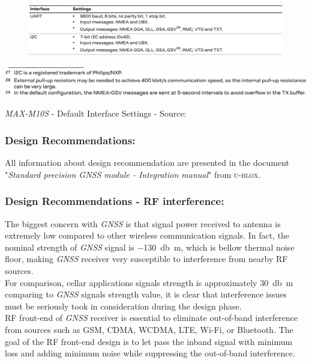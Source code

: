 \documentclass[report.tex]{subfiles}
\begin{document}
\begin{table}[H]
\begin{subfigure}{\textwidth}
	\centering
	\includegraphics[width=1\textwidth]{Include/Figure/comp/maxm10s_back_curr_i2c_spec.png}
\end{subfigure}
	\centering
	\includegraphics[width=1\textwidth]{Include/Figure/comp/maxm10s_back_curr_i2c_spec2.png}
\caption{\textit{MAX-M10S} - Default Interface Settings - Source: \cite{MAXM10S}}
\label{tab:maxm10s_back_curr_i2c_spec}
\end{table}

\subsubsection{Design Recommendations:}
All information about design recommendation are presented in the document "\textit{Standard precision GNSS module - Integration manual}"\cite{MAXM10SINT} from \textsc{u-blox}.
\subsubsection{Design Recommendations - RF interference:}
The biggest concern with \textit{GNSS} is that signal power received to antenna is extremely low compared to other wireless communication signals. In fact, the nominal strength of \textit{GNSS} signal is \SI{-130}{\decibel m}, which is bellow thermal noise floor, making \textit{GNSS} receiver very susceptible to interference from nearby RF sources.\\

For comparison, cellar applications signals strength is approximately \SI{30}{\decibel m} comparing to \textit{GNSS} signals strength value, it is clear that interference issues must be seriously took in consideration during the design phase.\\

RF front-end of \textit{GNSS} receiver is essential to eliminate out-of-band interference from sources such as GSM, CDMA, WCDMA, LTE, Wi-Fi, or Bluetooth. The goal of the RF front-end design is to let pass the inband signal with minimum loss and adding minimum noise while suppressing the out-of-band interference.\\
\end{document}
